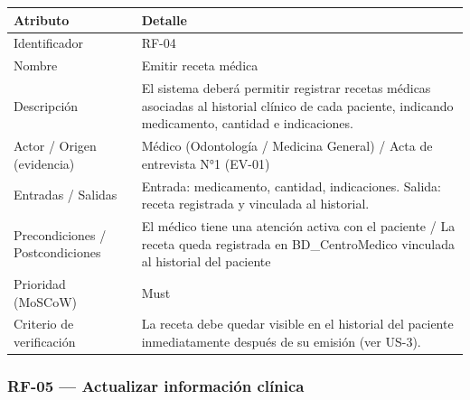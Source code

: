 \documentclass[11pt,a4paper]{article}
\begin{document}
	\begin{longtable}{p{} p{}}
		
		\toprule
		\textbf{Atributo} & \textbf{Detalle} \\
		\midrule
		\endhead
		
		Identificador & RF-04 \\
		Nombre & Emitir receta médica \\
		Descripción & El sistema deberá permitir registrar recetas médicas asociadas al historial clínico de cada paciente, indicando medicamento, cantidad e indicaciones. \\
		Actor / Origen (evidencia) & Médico (Odontología / Medicina General) / Acta de entrevista N°1 (EV-01) \\
		Entradas / Salidas & Entrada: medicamento, cantidad, indicaciones. Salida: receta registrada y vinculada al historial. \\
		Precondiciones / Postcondiciones & El médico tiene una atención activa con el paciente / La receta queda registrada en BD\_CentroMedico vinculada al historial del paciente \\
		Prioridad (MoSCoW) & Must \\
		Criterio de verificación & La receta debe quedar visible en el historial del paciente inmediatamente después de su emisión (ver US-3). \\
		
		\bottomrule
		
	\end{longtable}
	
	\subsubsection{RF-05 --- Actualizar información clínica}
	
\end{document}
